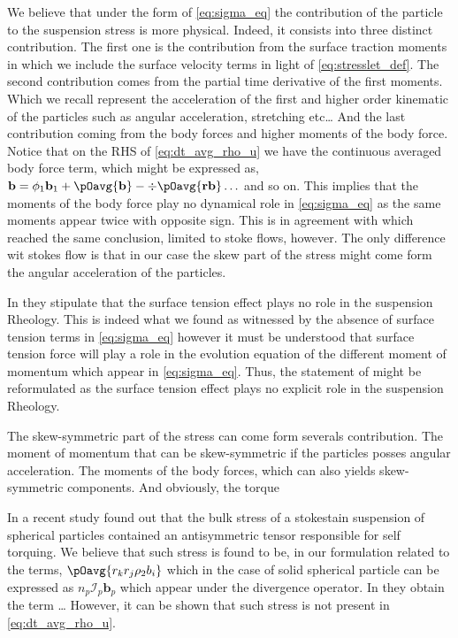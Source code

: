 We believe that under the form of \ref{eq:sigma_eq} the contribution of the particle to the suspension stress is more physical. 
Indeed, it consists into three distinct contribution. 
The first one is the contribution from the surface traction moments in which we include the surface velocity terms in light of \ref{eq:stresslet_def}. 
The second contribution comes from the partial time derivative of the first moments. 
Which we recall represent the acceleration of the first and higher order kinematic of the particles such as angular acceleration, stretching etc\ldots
And the last contribution coming from the body forces and higher moments of the body force. 
Notice that on the RHS of \ref{eq:dt_avg_rho_u} we have the continuous averaged body force term, which might be expressed as, 
$
    \textbf{b}
    = \phi_1 \textbf{b}_1 
    + \pOavg{\textbf{b}}
    - \div \pOavg{\textbf{r} \textbf{b}}
    \ldots
$
and so on. 
This implies that the moments of the body force play no dynamical role in \ref{eq:sigma_eq} as the same moments appear twice with opposite sign. 
This is in agreement with \citet{dolata2020heterogeneous} which reached the same conclusion, limited to stoke flows, however. 
The only difference wit stokes flow is that in our case the skew part of the stress might come form the angular acceleration of the particles. 

In \citet{dolata2020heterogeneous} they stipulate that the surface tension effect plays no role in the suspension Rheology. 
This is indeed what we found as witnessed by the absence of surface tension terms in \ref{eq:sigma_eq} however it must be understood that surface tension force will play a role in the evolution equation of the different moment of momentum which appear in \ref{eq:sigma_eq}. 
Thus, the statement of \citet{dolata2020heterogeneous} might be reformulated as the surface tension effect plays no explicit role in the suspension Rheology. 

The skew-symmetric part of the stress can come form severals contribution. 
The moment of momentum that can be skew-symmetric if the particles posses angular acceleration. 
The moments of the body forces, which can also yields skew-symmetric components. 
And obviously, the torque 

In a recent study \citet{wolgemuth2023continuum} found out that the bulk stress of a stokestain suspension of spherical particles contained an antisymmetric tensor responsible for self torquing. 
We believe that such stress is found to be, in our formulation related to the terms, $\pOavg{r_{k}r_{j}  \rho_2 b_i }$ which in the case of solid spherical particle can be expressed as $n_p\mathcal{I}_p \textbf{b}_p$ which appear under the divergence operator. 
In \citet{wolgemuth2023continuum} they obtain the term \ldots
However, it can be shown that such stress is not present in \ref{eq:dt_avg_rho_u}. 

